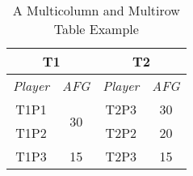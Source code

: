 \begin{table}[!bt]
	\renewcommand{\arraystretch}{1.3}
	\caption{A Multicolumn and Multirow Table Example}
	\label{tab:multi_example}
	\vspace{-2ex}
	\centering
 \begin{tabular}{c|c|c|c}
 \hline
\hline
 \multicolumn{2}{c|}{\textbf{T1}} & \multicolumn{2}{|c}{\textbf{T2}} \\
 \hline
 \textit{Player} & \textit{AFG} & \textit{Player} & \textit{AFG} \\
 \hline
 T1P1 & \multirow{2}[4]{*}{30} & T2P3 & 30 \\
\cline{1-1}\cline{3-4} T1P2 &       & T2P2 & 20 \\
 \hline
 T1P3  & 15    & T2P3  & 15 \\
 \hline
 \hline
 \end{tabular}%
\end{table}





